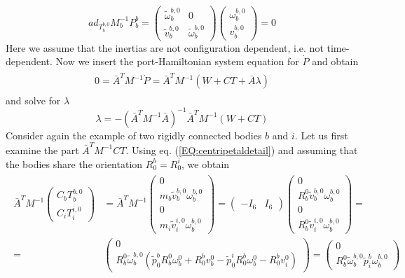 \documentclass[a4paper,twoside, openright,12pt]{report}
\begin{document}
\begin{equation}
ad_{T_b^{b,0}}M_b^{-1}P_b^b = \begin{pmatrix}
\tilde{\omega}_b^{b,0} & 0 \\ \tilde{v}_b^{b,0} & \tilde{\omega}_b^{b,0}\end{pmatrix} \begin{pmatrix}\omega_b^{b,0} \\ v_b^{b,0}\end{pmatrix} = 0
\end{equation}
Here we assume that the inertias are not configuration dependent, i.e. not time-dependent. Now we insert the port-Hamiltonian system equation for $\dot{P}$ and obtain
\begin{eqnarray}
\begin{aligned}
0 = \bar{A}^T M^{-1} \dot{P} = \bar{A}^T M^{-1}(W+CT+\bar{A}\lambda)
\end{aligned}
\end{eqnarray}
and solve for $\lambda$
\begin{equation}
\lambda = -(\bar{A}^TM^{-1}\bar{A})^{-1}\bar{A}^TM^{-1}(W+CT)
\end{equation}
Consider again the example of two rigidly connected bodies $b$ and $i$. Let us first examine the part $\bar{A}^TM^{-1}CT$. Using eq. (\ref{EQ:centripetaldetail}) and assuming that the bodies share the orientation $R_0^b = R_0^i$, we obtain
\begin{eqnarray}
\begin{aligned}
\bar{A}^TM^{-1}\begin{pmatrix}
C_b T_b^{b,0} \\ C_i T_i^{i,0}
\end{pmatrix} 
&=
\bar{A}^T M^{-1} \begin{pmatrix} 0 \\ m_b \tilde{v}_b^{b,0}\omega_b^{b,0} \\ 0 \\ m_i \tilde{v}_i^{i,0}\omega_b^{b,0}
\end{pmatrix}
=
\begin{pmatrix}-I_6 & I_6\end{pmatrix} \begin{pmatrix}
0 \\ R_b^0 \tilde{v}_b^{b,0} \omega_b^{b,0} \\ 0 \\
R_b^0 \tilde{v}_i^{i,0} \omega_b^{b,0}
\end{pmatrix} = \\ 
=&
\begin{pmatrix}
0 \\ R_b^0\tilde{\omega}_b^{b,0}
(\tilde{p}_0^b R_b^0 \omega_b^0 + R_0^b v_b^0 - \tilde{p}_0^i R_0^b \omega_b^0 - R_0^b v_i^0)
\end{pmatrix} 
=
\begin{pmatrix}0 \\
R_b^0\tilde{\omega}_b^{b,0}
\tilde{p}_i^b \omega_b^{b,0}
\end{pmatrix} 
\end{aligned}
\end{eqnarray}
\end{document}
